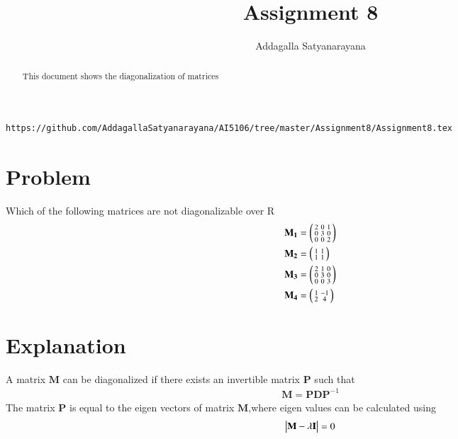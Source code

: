 \documentclass[journal,12pt,twocolumn]{IEEEtran}
\begin{document}
	\makeatother
	\let\StandardTheFigure\thefigure
	\let\vec\mathbf
	\renewcommand{\thefigure}{\theproblem}
	\def\putbox#1#2#3{\makebox[0in][l]{\makebox[#1][l]{}\raisebox{\baselineskip}[0in][0in]{\raisebox{#2}[0in][0in]{#3}}}}
	\def\rightbox#1{\makebox[0in][r]{#1}}
	\def\centbox#1{\makebox[0in]{#1}}
	\def\topbox#1{\raisebox{-\baselineskip}[0in][0in]{#1}}
	\def\midbox#1{\raisebox{-0.5\baselineskip}[0in][0in]{#1}}
	\vspace{3cm}
	\title{Assignment 8}
	\author{Addagalla Satyanarayana}
	\maketitle
	\newpage
	\bigskip
	\renewcommand{\thefigure}{\theenumi}
	\renewcommand{\thetable}{\theenumi}
\begin{abstract}
This document shows the diagonalization of matrices
\end{abstract}

%
\begin{lstlisting}
https://github.com/AddagallaSatyanarayana/AI5106/tree/master/Assignment8/Assignment8.tex
\end{lstlisting}
%
\section{Problem}
	Which of the following matrices are not diagonalizable over R
\begin{align}
\vec{M_1}&=\myvec{2&0&1\\0&3&0\\0 & 0&2}\\
\vec{M_2}&=\myvec{1&1\\1&1}\\
\vec{M_3}&=\myvec{2&1&0\\0&3&0\\0 & 0&3}\\
\vec{M_4}&=\myvec{1&-1\\2&4}
\end{align}

\section{Explanation}
A matrix $\vec{M}$ can be diagonalized if there exists an invertible matrix $\vec{P}$ such that
\begin{align}
\vec{M} = \vec{P}\vec{D}\vec{P}^{-1}\label{eq:1}
\end{align}
The matrix $\vec{P}$ is equal to the eigen vectors of matrix $\vec{M}$,where eigen values can be calculated using
\begin{align}
	\mydet{\vec{M}-\lambda\vec{I}}=0\label{eq:2}
\end{align}
\end{document}
